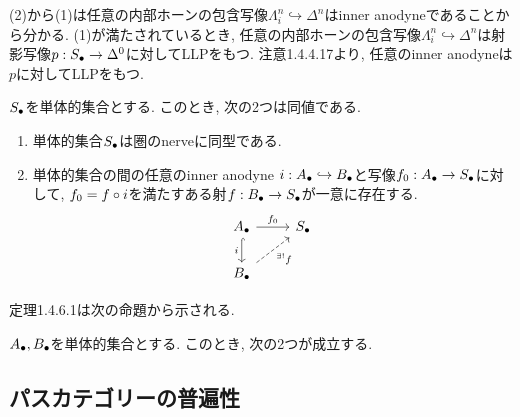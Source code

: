 \documentclass[uplatex, a4paper, 14Q, dvipdfmx]{jsreport}
\begin{document}
\begin{Proof}
  (2)から(1)は任意の内部ホーンの包含写像$\Lambda^n_i \hookrightarrow \Delta^n$はinner anodyneであることから分かる. 
  (1)が満たされているとき, 任意の内部ホーンの包含写像$\Lambda^n_i \hookrightarrow \Delta^n$は射影写像$p: \S \to \Delta^0$に対してLLPをもつ. 
  注意1.4.4.17より, 任意のinner anodyneは$p$に対してLLPをもつ. 
\end{Proof}

\begin{prop}
  $\S$を単体的集合とする. 
  このとき, 次の2つは同値である.
  \begin{enumerate}
    \item 単体的集合$\S$は圏のnerveに同型である. 
    \item 単体的集合の間の任意のinner anodyne $i: \A \hookrightarrow \B$と写像$f_0: \A \to \S$に対して, 
    $f_0=f \ci i$を満たすある射$f: \B \to \S$が一意に存在する.
    \[\begin{tikzcd}
      \A & \S \\
      \B
      \arrow["{f_0}", from=1-1, to=1-2]
      \arrow["i"', hook, from=1-1, to=2-1]
      \arrow["{{}^{\exists!} f}"', dashed, from=2-1, to=1-2]
    \end{tikzcd}\]
  \end{enumerate}
\end{prop}

定理1.4.6.1は次の命題から示される. 

\begin{lemma}[Joyal]
  $\A, \B$を単体的集合とする. 
  このとき, 次の2つが成立する. 

\end{lemma}

\subsection{パスカテゴリーの普遍性}
\end{document}
